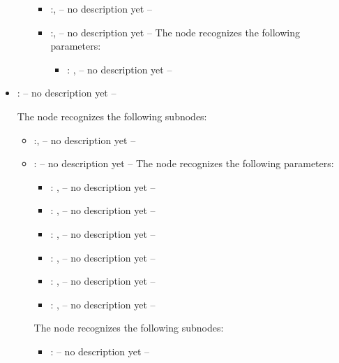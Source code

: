 \begin{itemize}
\begin{itemize}
\begin{itemize}
            \item {}:, 
              -- no description yet --

            \item {}:, 
              -- no description yet --
              The  node recognizes the following parameters:
                \begin{itemize}
                  \item {}: , 
                    -- no description yet --
              \end{itemize}
          \end{itemize}
      \end{itemize}

    \item {}:
      -- no description yet --

      The  node recognizes the following subnodes:
      \begin{itemize}
        \item {}:, 
          -- no description yet --

        \item {}:
          -- no description yet --
          The  node recognizes the following parameters:
            \begin{itemize}
              \item {}: , 
                -- no description yet --
              \item {}: , 
                -- no description yet --
              \item {}: , 
                -- no description yet --
              \item {}: , 
                -- no description yet --
              \item {}: , 
                -- no description yet --
              \item {}: , 
                -- no description yet --
          \end{itemize}

          The  node recognizes the following subnodes:
          \begin{itemize}
            \item {}:
              -- no description yet --


\end{itemize}
\end{itemize}
\end{itemize}
